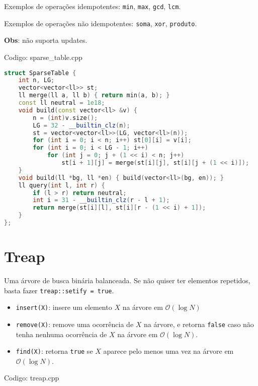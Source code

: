 \documentclass[10pt, a4paper, oneside]{book}
\begin{document}
Exemplos de operações idempotentes: \texttt{min}, \texttt{max}, \texttt{gcd}, \texttt{lcm}.



Exemplos de operações não idempotentes: \texttt{soma}, \texttt{xor}, \texttt{produto}.



\textbf{Obs}: não suporta updates.

\hfill

Codigo: sparse\_table.cpp

\begin{lstlisting}[language=C++]
struct SparseTable {
    int n, LG;
    vector<vector<ll>> st;
    ll merge(ll a, ll b) { return min(a, b); }
    const ll neutral = 1e18;
    void build(const vector<ll> &v) {
        n = (int)v.size();
        LG = 32 - __builtin_clz(n);
        st = vector<vector<ll>>(LG, vector<ll>(n));
        for (int i = 0; i < n; i++) st[0][i] = v[i];
        for (int i = 0; i < LG - 1; i++)
            for (int j = 0; j + (1 << i) < n; j++)
                st[i + 1][j] = merge(st[i][j], st[i][j + (1 << i)]);
    }
    void build(ll *bg, ll *en) { build(vector<ll>(bg, en)); }
    ll query(int l, int r) {
        if (l > r) return neutral;
        int i = 31 - __builtin_clz(r - l + 1);
        return merge(st[i][l], st[i][r - (1 << i) + 1]);
    }
};
\end{lstlisting}
\hfill

\section{Treap}


Uma árvore de busca binária balanceada. Se não quiser ter elementos repetidos, basta fazer \texttt{treap::setify = true}.



\begin{itemize}
\item \texttt{insert(X)}: insere um elemento $X$ na árvore em $\mathcal{O}(\log N)$
\item \texttt{remove(X)}: remove uma ocorrência de $X$ na árvore, e retorna \texttt{false} caso não tenha nenhuma ocorrência de $X$ na árvore em $\mathcal{O}(\log N)$.
\item \texttt{find(X)}: retorna \texttt{true} se $X$ aparece pelo menos uma vez na árvore em $\mathcal{O}(\log N)$.
\end{itemize}

\hfill

Codigo: treap.cpp
\end{document}

